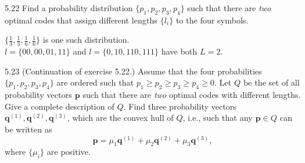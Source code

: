 \documentclass[12pt, a4paper]{article}
\begin{document}
\bigskip

\begin{prob}{5.22}
Find a probability distribution $\{p_1, p_2, p_3, p_4\}$ such that there are \emph{two} optimal codes that assign different lengths $\{l_i\}$ to the four symbols.
\end{prob}
\begin{sol}
$\{\frac{1}{3}, \frac{1}{3}, \frac{1}{6}, \frac{1}{6}\}$ is one such distribution.\\
$l = \{00, 00, 01, 11\}$ and $l = \{0, 10, 110, 111\}$ have both $L = 2$.
\end{sol}
\bigskip

\begin{prob}{5.23}
(Continuation of exercise 5.22.) Assume that the four probabilities $\{p_1, p_2, p_3, p_4\}$ are ordered such that $p_1 \ge p_2 \ge p_3 \ge p_4 \ge 0$. Let $Q$ be the set of all probability vectors $\mathbf{p}$ such that there are \emph{two} optimal codes with different lengths. Give a complete description of $Q$. Find three probability vectors $\mathbf{q}^{(1)}, \mathbf{q}^{(2)}, \mathbf{q}^{(3)}$, which are the convex hull of $Q$, i.e., such that any $\mathbf{p} \in Q$ can be written as
\begin{equation}
    \mathbf{p} = \mu_1\mathbf{q}^{(1)} + \mu_2\mathbf{q}^{(2)} + \mu_3\mathbf{q}^{(3)}, \tag{5.29}
\end{equation}
where $\{\mu_i\}$ are positive.
\end{prob}
\end{document}
